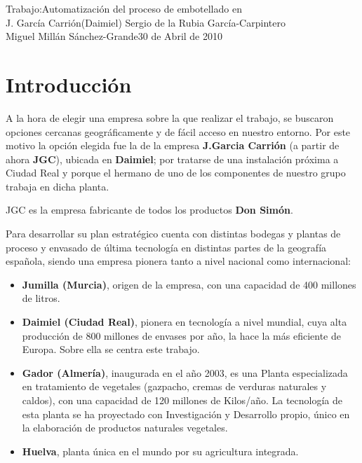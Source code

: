 \documentclass[11pt,a4paper,spanish,twoside]{report}
\begin{document}


{Trabajo:}{Automatización del proceso de embotellado en\\ J. García Carrión(Daimiel)}
{Sergio de la Rubia García-Carpintero\\Miguel Millán Sánchez-Grande}{30 de Abril de 2010}


\tableofcontents


\chapter{Introducción}
A la hora de elegir una empresa sobre la que realizar el trabajo, se buscaron
opciones cercanas geográficamente y de fácil acceso en nuestro entorno. Por
este motivo la opción elegida fue la de la empresa \textbf{J.Garcia Ca\-rrión}
(a partir de ahora \textbf{JGC}), ubicada en \textbf{Daimiel}; por tratarse de
una instalación próxima a Ciudad Real y porque el hermano de uno de los 
componentes de nuestro grupo trabaja en dicha planta.

JGC es la empresa fabricante de todos los productos \textbf{Don Simón}.

Para desarrollar su plan estratégico cuenta con distintas bodegas y 
plantas de proceso y envasado de última tecnología en distintas partes de la
geografía española, siendo una empresa pionera tanto a nivel nacional como
internacional:

\begin{itemize}
\item \textbf{Jumilla (Murcia)}, origen de la empresa, con una capacidad de 
400 millones de litros. 
\item \textbf{Daimiel (Ciudad Real)}, pionera en tecnología a nivel mundial, 
cuya alta producción de 800 millones de envases por año, la hace la más 
eficiente de Europa. Sobre ella se centra este trabajo.
\item \textbf{Gador (Almería)}, inaugurada en el año 2003, es una Planta 
especia\-li\-za\-da en tratamiento de vegetales (gazpacho, cremas de verduras
na\-tu\-ra\-les y caldos), con una capacidad de 120 millones de Kilos/año. La
tecnología de esta planta se ha proyectado con Investigación y Desarrollo 
propio, único en la elaboración de productos naturales vegetales. 
\item \textbf{Huelva}, planta única en el mundo por su agricultura integrada.
\end{itemize}
\end{document}
